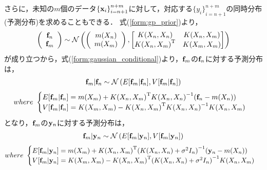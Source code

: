 \documentclass[11pt,a4j]{article}
\begin{document}
      さらに，未知の$m$個のデータ${\{ {\bf x}_i \} }_{i=n+1}^{n+m}$に対して，対応する${\{ y_i \} }_{i=n+1}^{n+m}$の同時分布(予測分布)を求めることもできる．
      式(\ref{form:gp_prior})より，
      \begin{align}
        \left(
          \begin{array}{c}
            {\bf f}_n \\ {\bf f}_m
          \end{array}
        \right)
        \sim
        \mathcal{N} 
        \left(
          \left(
            \begin{array}{c}
              m(X_n) \\ m(X_m)
            \end{array}
          \right)
          ,
          \begin{bmatrix}
            K(X_n,X_n) & K(X_n,X_m) \\
            {K(X_n,X_m)}^{\mathrm{T}} & K(X_m,X_m)
          \end{bmatrix}
        \right)
      \end{align}
      が成り立つから，式(\ref{form:gaussian_conditional})より，${\bf f}_m$の${\bf f}_n$に対する予測分布は，
      \begin{align}
        {\bf f}_m | {\bf f}_n \sim \mathcal{N}\left( E[{\bf f}_m | {\bf f}_n], V[{\bf f}_m | {\bf f}_n] \right) 
      \end{align}
      \begin{align}          
        where ~ 
        \begin{cases}
          E[{\bf f}_m | {\bf f}_n] = m(X_m) + {K(X_n,X_m)}^{\mathrm{T}} {K(X_n,X_n)}^{-1} ( {\bf f}_n - m(X_n) ) \\
          V[{\bf f}_m | {\bf f}_n] = K(X_m,X_m) - {K(X_n,X_m)}^{\mathrm{T}} {K(X_n,X_n)}^{-1} K(X_n,X_m)
        \end{cases} \nonumber
      \end{align}
      となり，${\bf f}_m$の${\bf y}_n$に対する予測分布は，
      \begin{align}
        {\bf f}_m | {\bf y}_n \sim \mathcal{N}\left( E[{\bf f}_m | {\bf y}_n], V[{\bf f}_m | {\bf y}_n] \right) 
      \end{align}
      \begin{align}          
        where ~ 
        \begin{cases}
          E[{\bf f}_m | {\bf y}_n] = m(X_m) + {K(X_n,X_m)}^{\mathrm{T}} {( K(X_n,X_n) + \sigma^2 I_n )} ^{-1} ( {\bf y}_n - m(X_n) ) \\
          V[{\bf f}_m | {\bf y}_n] = K(X_m,X_m) - {K(X_n,X_m)}^{\mathrm{T}} { ( K(X_n,X_n) + \sigma^2 I_n ) }^{-1} K(X_n,X_m)
        \end{cases} \nonumber
      \end{align}
\end{document}
